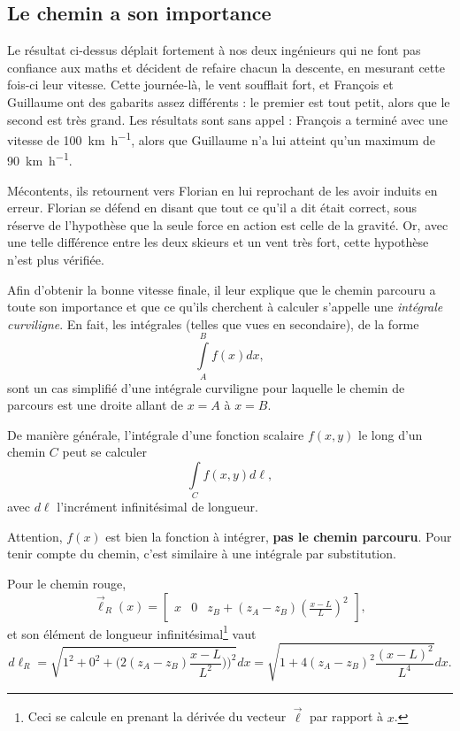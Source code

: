 \documentclass[10pt,oneside]{article}
\begin{document}
\subsection{Le chemin a son importance}

Le résultat ci-dessus déplait fortement à nos deux ingénieurs qui ne font pas confiance aux maths et décident de refaire chacun la descente, en mesurant cette fois-ci leur vitesse. Cette journée-là, le vent soufflait fort, et François et Guillaume ont des gabarits assez différents : le premier est tout petit, alors que le second est très grand. Les résultats sont sans appel : François a terminé avec une vitesse de \SI{100}{\kilo\meter\per\hour}, alors que Guillaume n'a lui atteint qu'un maximum de \SI{90}{\kilo\meter\per\hour}.

Mécontents, ils retournent vers Florian en lui reprochant de les avoir induits en erreur. Florian se défend en disant que tout ce qu'il a dit était correct, sous réserve de l'hypothèse que la seule force en action est celle de la gravité. Or, avec une telle différence entre les deux skieurs et un vent très fort, cette hypothèse n'est plus vérifiée.

Afin d'obtenir la bonne vitesse finale, il leur explique que le chemin parcouru a toute son importance et que ce qu'ils cherchent à calculer s'appelle une \emph{intégrale curviligne}. En fait, les intégrales (telles que vues en secondaire), de la forme
\begin{equation}
    \int\limits_A^B f(x) dx,
\end{equation}
sont un cas simplifié d'une intégrale curviligne pour laquelle le chemin de parcours est une droite allant de $x=A$ à $x=B$.

De manière générale, l'intégrale d'une fonction scalaire $f(x,y)$ le long d'un chemin $C$ peut se calculer
\begin{equation}
    \int\limits_C f(x,y) d\ell,
\end{equation}
avec $d\ell$ l'incrément infinitésimal de longueur. 

Attention, $f(x)$ est bien la fonction à intégrer, \textbf{pas le chemin parcouru}. Pour tenir compte du chemin, c'est similaire à une intégrale par substitution.

Pour le chemin rouge, 
\begin{equation}
    \vec{\ell}_R(x) = \begin{bmatrix}x & 0 & z_B + (z_A - z_B)\left(\frac{x-L}{L}\right)^2\end{bmatrix},
\end{equation}
et son élément de longueur infinitésimal\footnote{Ceci se calcule en prenant la dérivée du vecteur $\vec{\ell}$ par rapport à $x$.} vaut
\begin{equation}
    d\ell_R = \sqrt{1^2 + 0^2 + \Big(2(z_A - z_B)\frac{x-L}{L^2})\Big)^2} dx = \sqrt{1  + 4(z_A-z_B)^2 \frac{(x-L)^2}{L^4}} dx.
\end{equation}
\end{document}
